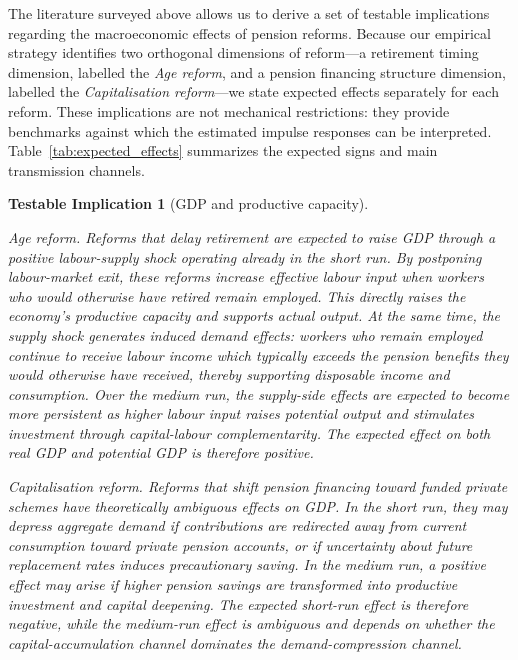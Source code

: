\documentclass[11pt,english,a4paper, twoside, authoryear]{article}
\newtheorem{testable}{Testable Implication}}
\begin{document}
The literature surveyed above allows us to derive a set of testable implications regarding the macroeconomic effects of pension reforms. Because our empirical strategy identifies two orthogonal dimensions of reform---a retirement timing dimension, labelled the \emph{Age reform}, and a pension financing structure dimension, labelled the \emph{Capitalisation reform}---we state expected effects separately for each reform. These implications are not mechanical restrictions: they provide benchmarks against which the estimated impulse responses can be interpreted. Table~\ref{tab:expected_effects} summarizes the expected signs and main transmission channels. 

\begin{testable}[GDP and productive capacity]\label{test:gdp}

\emph{Age reform}. Reforms that delay retirement are expected to raise GDP through a positive labour-supply shock operating already in the short run. By postponing labour-market exit, these reforms increase effective labour input when workers who would otherwise have retired remain employed. This directly raises the economy's productive capacity and supports actual output. At the same time, the supply shock generates induced demand effects: workers who remain employed continue to receive labour income which typically exceeds the pension benefits they would otherwise have received, thereby supporting disposable income and consumption. Over the medium run, the supply-side effects are expected to become more persistent as higher labour input raises potential output and stimulates investment through capital-labour complementarity. The expected effect on both real GDP and potential GDP is therefore positive.


\emph{Capitalisation reform.} Reforms that shift pension financing toward funded private schemes have theoretically ambiguous effects on GDP. In the short run, they may depress aggregate demand if contributions are redirected away from current consumption toward private pension accounts, or if uncertainty about future replacement rates induces precautionary saving. In the medium run, a positive effect may arise if higher pension savings are transformed into productive investment and capital deepening. The expected short-run effect is therefore negative, while the medium-run effect is ambiguous and depends on whether the capital-accumulation channel dominates the demand-compression channel.



\end{testable}
\end{document}
